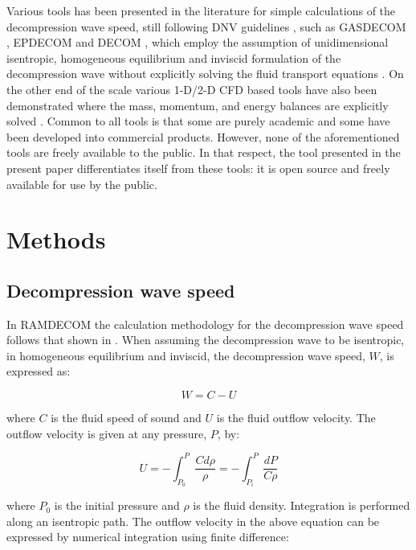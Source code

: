 \documentclass[a4paper, 10pt, twocolumn, twoside]{scrartcl}
\begin{document}
Various tools has been presented in the literature for simple calculations of the decompression wave speed, still following DNV guidelines \cite{dnv}, such as GASDECOM \cite{Cosham_GASDECOM}, EPDECOM \cite{Lu2012_EPDECOM} and DECOM \cite{Cosham_DECOM}, which employ the assumption of unidimensional isentropic, homogeneous equilibrium and inviscid formulation of the decompression wave without explicitly
solving the fluid transport equations \cite{Liu_2017}. On the other end of the scale  various 1-D/2-D CFD based tools have also been demonstrated where the mass, momentum, and energy balances are explicitly solved \cite{Xu2014_CFDDECOM,OKE20034591_pipetech_CFD,ELSHAHOMI201520_CFD,Fang2019}. Common to all tools is that some are purely academic and some have been developed into commercial products. However, none of the aforementioned tools are freely available to the public. In that respect, the tool presented in the present paper differentiates itself from these tools: it is open source and freely available for use by the public. 

\section{Methods}

\subsection{Decompression wave speed}
In RAMDECOM the calculation methodology for the decompression wave speed follows that shown in \cite{GU2018237,Hu2021}. When assuming the decompression wave to be isentropic, in  homogeneous equilibrium and inviscid, the decompression wave speed, $W$, is expressed as:

\begin{equation}\label{eqn:decompression}
W = C - U 
\end{equation}

where $C$ is the fluid speed of sound and $U$ is the fluid outflow velocity. The outflow velocity is given at any pressure, $P$, by:

\begin{equation}\label{eqn:outflow}
U = -\int_{P_0}^{P}{\frac{Cd\rho}{\rho}} = -\int_{P_i}^{P}{\frac{dP}{C\rho}}
\end{equation}

where $P_0$ is the initial pressure and $\rho$ is the fluid density. Integration is performed along an isentropic path. The outflow velocity in the above equation can be expressed by numerical integration using finite difference:
\end{document}
